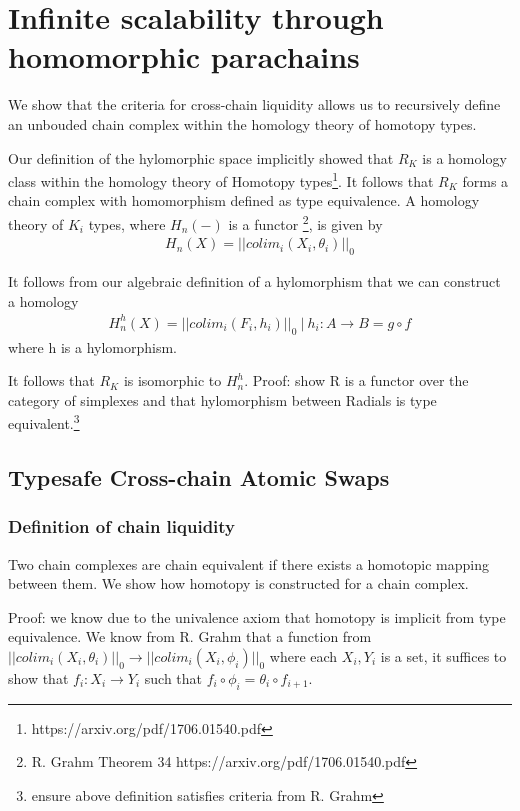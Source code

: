\documentclass{article}
\begin{document}
\section{Infinite scalability through homomorphic parachains}
We show that the criteria for cross-chain liquidity allows us to recursively define an unbouded chain complex within the homology theory of homotopy types.

Our definition of the hylomorphic space implicitly showed that $R_K$ is a homology class within the homology theory of Homotopy types\footnote{https://arxiv.org/pdf/1706.01540.pdf}. It follows that $R_K$ forms a chain complex with homomorphism defined as type equivalence. A homology theory of $K_i$ types, where $H_n(-)$ is a functor \footnote{R. Grahm Theorem 34 https://arxiv.org/pdf/1706.01540.pdf}, is given by 
\begin{equation} \label{eq1}
\begin{split}
H_n(X) = || colim_i (X_i,\theta_i) ||_0
\end{split}
\end{equation}

It follows from our algebraic definition of a hylomorphism that we can construct a homology
\begin{equation} \label{eq1}
\begin{split}
H^{h}_n(X) = || colim_i (F_i, h_i) ||_0 \ | \ h_i: A \rightarrow B = g \circ f
\end{split}
\end{equation}
where h is a hylomorphism.

It follows that $R_K$ is isomorphic to $H^{h}_n$. Proof: show R is a functor over the category of simplexes and that hylomorphism between Radials is type equivalent.\footnote{ensure above definition satisfies criteria from R. Grahm}

\subsection{Typesafe Cross-chain Atomic Swaps}
\subsubsection{Definition of chain liquidity}
Two chain complexes are chain equivalent if there exists a homotopic mapping between them. We show how homotopy is constructed for a chain complex.

Proof: we know due to the univalence axiom that homotopy is implicit from type equivalence. We know from R. Grahm that a function from $|| colim_i (X_i,\theta_i) ||_0 \rightarrow || colim_i (X_i,\phi_i) ||_0$ where each $ X_i,Y_i $ is a set, it suffices to show that $f_i: X_i  \rightarrow Y_i$ such that $ f_i \circ \phi_i =  \theta_i \circ f_{i+1}$.
\end{document}
